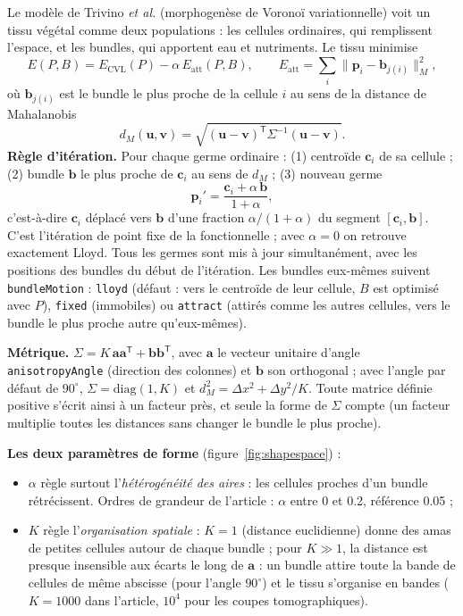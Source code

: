 \documentclass[10pt,a4paper]{article}
\newcommand{\code}[1]{\texttt{#1}}
\newcommand{\vect}[1]{\boldsymbol{#1}}
\begin{document}
Le modèle de Trivino \textit{et al.} (morphogenèse de Voronoï variationnelle) voit un tissu végétal comme deux
populations : les cellules ordinaires, qui remplissent l'espace, et les bundles, qui apportent eau et
nutriments. Le tissu minimise
\begin{equation}
  E(P,B)=E_{\mathrm{CVL}}(P)-\alpha\,E_{\mathrm{att}}(P,B),\qquad
  E_{\mathrm{att}}=\sum_i\|\vect p_i-\vect b_{j(i)}\|^2_M ,
\end{equation}
où $\vect b_{j(i)}$ est le bundle le plus proche de la cellule $i$ au sens de la distance de Mahalanobis
\begin{equation}
  d_M(\vect u,\vect v)=\sqrt{(\vect u-\vect v)^{\mathsf T}\Sigma^{-1}(\vect u-\vect v)} .
\end{equation}
\textbf{Règle d'itération.} Pour chaque germe ordinaire : (1) centroïde $\vect c_i$ de sa cellule ; (2) bundle
$\vect b$ le plus proche de $\vect c_i$ au sens de $d_M$ ; (3) nouveau germe
\begin{equation}\label{eq:update}
  \vect p_i'=\frac{\vect c_i+\alpha\,\vect b}{1+\alpha} ,
\end{equation}
c'est-à-dire $\vect c_i$ déplacé vers $\vect b$ d'une fraction $\alpha/(1+\alpha)$ du segment
$[\vect c_i,\vect b]$. C'est l'itération de point fixe de la fonctionnelle ; avec $\alpha=0$ on retrouve
exactement Lloyd. Tous les germes sont mis à jour simultanément, avec les positions des bundles du début de
l'itération. Les bundles eux-mêmes suivent \code{bundleMotion} : \code{lloyd} (défaut : vers le centroïde de leur
cellule, $B$ est optimisé avec $P$), \code{fixed} (immobiles) ou \code{attract} (attirés comme les autres
cellules, vers le bundle le plus proche autre qu'eux-mêmes).

\textbf{Métrique.} $\Sigma=K\,\vect a\vect a^{\mathsf T}+\vect b\vect b^{\mathsf T}$, avec $\vect a$ le vecteur
unitaire d'angle \code{anisotropyAngle} (direction des colonnes) et $\vect b$ son orthogonal ; avec l'angle par
défaut de $90^\circ$, $\Sigma=\mathrm{diag}(1,K)$ et $d_M^2=\Delta x^2+\Delta y^2/K$. Toute matrice définie positive
s'écrit ainsi à un facteur près, et seule la forme de $\Sigma$ compte (un facteur multiplie toutes les distances
sans changer le bundle le plus proche).

\textbf{Les deux paramètres de forme} (figure~\ref{fig:shapespace}) :
\begin{itemize}
  \item $\alpha$ règle surtout l'\emph{hétérogénéité des aires} : les cellules proches d'un bundle rétrécissent.
    Ordres de grandeur de l'article : $\alpha$ entre 0 et 0.2, référence 0.05 ;
  \item $K$ règle l'\emph{organisation spatiale} : $K=1$ (distance euclidienne) donne des amas de petites
    cellules autour de chaque bundle ; pour $K\gg1$, la distance est presque insensible aux écarts le long de
    $\vect a$ : un bundle attire toute la bande de cellules de même abscisse (pour l'angle $90^\circ$) et le tissu
    s'organise en bandes ($K=1000$ dans l'article, $10^4$ pour les coupes tomographiques).
\end{itemize}
\end{document}
